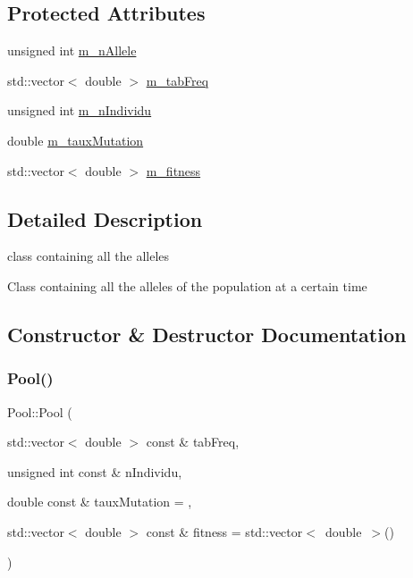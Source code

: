 \subsection*{Protected Attributes}
\begin{DoxyCompactItemize}
\item 
unsigned int \hyperlink{class_pool_aa42040dcc5fc415227c86f684e40eb0c}{m\+\_\+n\+Allele}
\item 
std\+::vector$<$ double $>$ \hyperlink{class_pool_ad3a94e7a298126eee82a7b4796a9970e}{m\+\_\+tab\+Freq}
\item 
unsigned int \hyperlink{class_pool_ae07f1e012a30ee7bb47280d03b5ccfb6}{m\+\_\+n\+Individu}
\item 
double \hyperlink{class_pool_a2d1dff3e84b72f7048d33dc3d711e9e0}{m\+\_\+taux\+Mutation}
\item 
std\+::vector$<$ double $>$ \hyperlink{class_pool_ab45fcdb067197181cace169cf12aedd2}{m\+\_\+fitness}
\end{DoxyCompactItemize}


\subsection{Detailed Description}
class containing all the alleles 

Class containing all the alleles of the population at a certain time 

\subsection{Constructor \& Destructor Documentation}
\hypertarget{class_pool_a6dac3ebc3877919011d52813b29ac40d}{}\label{class_pool_a6dac3ebc3877919011d52813b29ac40d} 
\subsubsection{\texorpdfstring{Pool()}{Pool()}\hspace{0.1cm}{\footnotesize\ttfamily [1/2]}}
{\footnotesize\ttfamily Pool\+::\+Pool (\begin{DoxyParamCaption}\item[{std\+::vector$<$ double $>$ const \&}]{tab\+Freq,  }\item[{unsigned int const \&}]{n\+Individu,  }\item[{double const \&}]{taux\+Mutation = {},  }\item[{std\+::vector$<$ double $>$ const \&}]{fitness = {\ttfamily std\+:\+:vector$<$~double~$>$()} }\end{DoxyParamCaption})}



